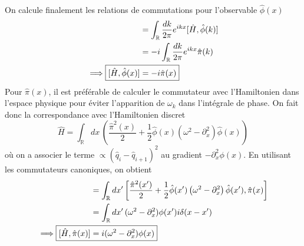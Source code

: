 \documentclass{article}
\numberwithin{equation}{section}
\theoremstyle{solution}
\begin{document}
On calcule finalement les relations de commutations pour l'observable $\hat{\phi}(x)$ 
\begin{align*}
        [\hat{H}, \hat{\phi}(x)] &= \int_{\mathbb{R}} \frac{dk}{2\pi} e^{ikx}[\hat{H},\hat{\phi}(k)]\\ 
        &= -i \int_{\mathbb{R}} \frac{dk}{2\pi} e^{ikx} \hat{\pi}(k) \\
        \implies \Aboxed{[\hat{H}, \hat{\phi}(x)] &= -i \hat{\pi}(x) }
\end{align*}
Pour $\hat{\pi}(x)$, il est préférable de calculer le commutateur avec l'Hamiltonien dans l'espace physique pour éviter l'apparition de $\omega_k$ dans l'intégrale de phase. 
On fait donc la correspondance avec l'Hamiltonien discret
\begin{equation}
        \hat{H} = \int_{\mathbb{R}}dx\, \left( \frac{\hat{\pi}^{2}(x)}{2} + \frac{1}{2}\hat{\phi}(x)\left( \omega^2 - \partial_{x}^2\right)\hat{\phi}(x) \right)
\end{equation} 
où on a associer le terme $\propto (\hat{q}_i - \hat{q}_{i+1})^2$ au gradient $-\partial_x^2 \phi(x)$. En utilisant les commutateurs canoniques, 
on obtient
\begin{align*}
        [\hat{H}, \hat{\pi} (x)] &= \int_{\mathbb{R}}dx'\,\bigg[\frac{\hat{\pi}^{2}(x')}{2} + \frac{1}{2}\hat{\phi}(x')\left( \omega^2 - \partial_{x}^2\right)\hat{\phi}(x'),\hat{\pi}(x)\bigg]\\ 
        &= \int_{\mathbb{R}}dx'\,(\omega^2 - \partial_x^2)\phi(x')  i\delta(x - x')\\ 
        \implies \Aboxed{ [\hat{H}, \hat{\pi} (x)] &= i(\omega^2 - \partial_x^2)\phi(x)  }
\end{align*}
\end{document}
